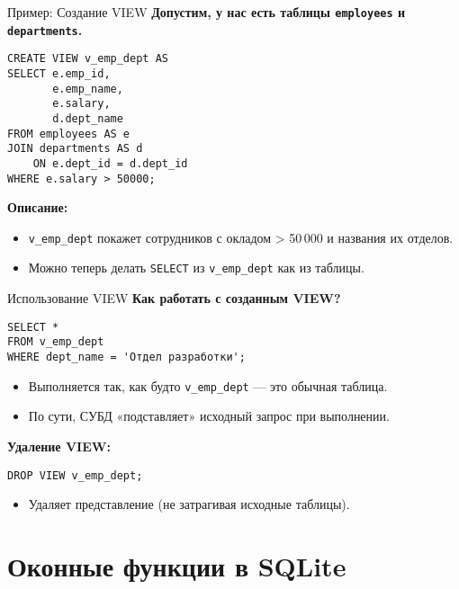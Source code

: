 \documentclass{beamer}
\begin{document}
\begin{frame}[fragile]{Пример: Создание VIEW}
	\textbf{Допустим, у нас есть таблицы \texttt{employees} и \texttt{departments}.}
	\begin{verbatim}
CREATE VIEW v_emp_dept AS
SELECT e.emp_id,
       e.emp_name,
       e.salary,
       d.dept_name
FROM employees AS e
JOIN departments AS d
    ON e.dept_id = d.dept_id
WHERE e.salary > 50000;
\end{verbatim}

	\textbf{Описание:}
	\begin{itemize}
		\item \texttt{v\_emp\_dept} покажет сотрудников с окладом > 50\,000 и названия их отделов.
		\item Можно теперь делать \texttt{SELECT} из \texttt{v\_emp\_dept} как из таблицы.
	\end{itemize}
\end{frame}

\begin{frame}[fragile]{Использование VIEW}
	\textbf{Как работать с созданным VIEW?}
	\begin{verbatim}
SELECT *
FROM v_emp_dept
WHERE dept_name = 'Отдел разработки';
\end{verbatim}

	\begin{itemize}
		\item Выполняется так, как будто \texttt{v\_emp\_dept} — это обычная таблица.
		\item По сути, СУБД «подставляет» исходный запрос при выполнении.
	\end{itemize}

	\textbf{Удаление VIEW:}
	\begin{verbatim}
DROP VIEW v_emp_dept;
\end{verbatim}
	\begin{itemize}
		\item Удаляет представление (не затрагивая исходные таблицы).
	\end{itemize}
\end{frame}

\section{Оконные функции в SQLite}
\end{document}
